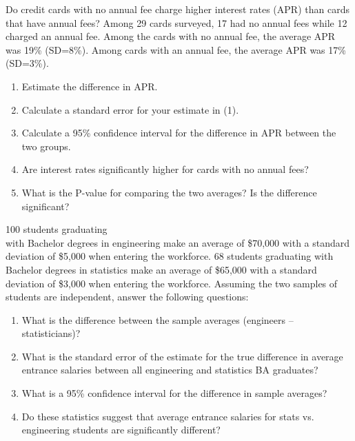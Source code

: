 \documentclass[11pt, chapterprefix=true]{scrbook}\usepackage[]{graphicx}\usepackage[]{color}
\begin{document}
\begin{exercises}

\begin{exercise} %

Do credit cards with no annual fee charge higher interest rates (APR) than cards that have annual fees?  Among 29 cards surveyed, 17 had no annual fees while 12 charged an annual fee.  Among the cards with no annual fee, the average APR was 19\% (SD=8\%).  Among cards with an annual fee, the average APR was 17\% (SD=3\%).

\begin{enumerate}
  \item Estimate the difference in APR.
  \item Calculate a standard error for your estimate in (1).
  \item Calculate a 95\% confidence interval for the difference in APR between the two groups.
  \item Are interest rates significantly higher for cards with no annual fees?
  \item What is the P-value for comparing the two averages? Is the difference significant?
\end{enumerate}
\end{exercise}
\begin{solution} %


\end{solution}

\begin{exercise}  %

100 students graduating \\ with Bachelor degrees in engineering make an average of \$70,000 with a standard deviation of \$5,000 when entering the workforce. 68 students graduating with Bachelor degrees in statistics make an average of \$65,000 with a standard deviation of \$3,000 when entering the workforce. Assuming the two samples of students are independent, answer the following questions:

\begin{enumerate}
  \item What is the difference between the sample averages (engineers – statisticians)?
  \item What is the standard error of the estimate for the true difference in average entrance salaries between all engineering and statistics BA graduates?
  \item What is a 95\% confidence interval for the difference in sample averages?
  \item Do these statistics suggest that average entrance salaries for stats vs. engineering students are significantly different?
\end{enumerate}


\end{exercise}
\end{exercises}
\end{document}
